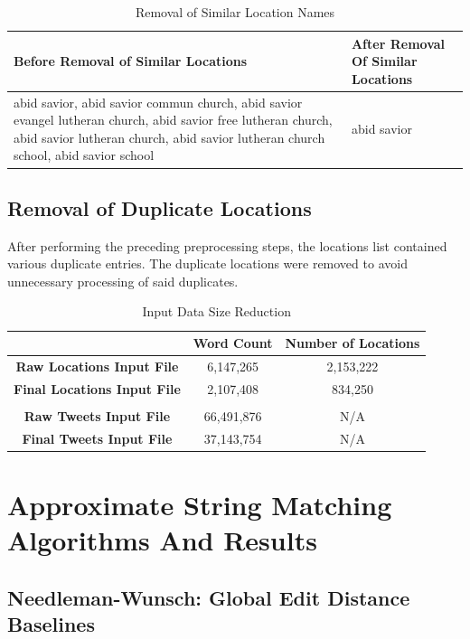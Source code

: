 \documentclass[11pt,a4paper]{article}
\begin{document}
\begin{table}[h]
\caption{Removal of Similar Location Names}	
\centering
	\begin{tabular}{| p{7cm} | p{7cm} | }
	\hline
	\textbf{Before Removal of Similar Locations} & \textbf{After Removal Of Similar Locations}\\
	\hline
	abid savior, abid savior commun church, abid savior evangel lutheran church, abid savior free lutheran church, abid savior lutheran church, abid savior lutheran church school, abid savior school & abid savior
	\\
	\hline
	\end{tabular}
\label{table:similar-locals}

\end{table}

\subsection{Removal of Duplicate Locations}       
After performing the preceding preprocessing steps, the locations list contained various duplicate entries. The duplicate locations were removed to avoid unnecessary processing of said duplicates.

\begin{table} [th]
\caption{Input Data Size Reduction}
\centering
	\begin{tabular}{| c | c | c |}
	\hline
	 &  \textbf{Word Count} & \textbf{Number of Locations}\\
	\hline
	\textbf{Raw Locations Input File} & 6,147,265 & 2,153,222\\
	\hline
	\textbf{Final Locations Input File} & 2,107,408 & 834,250\\
	\hline
	 &  & \\
	\hline
	\textbf{Raw Tweets Input File} & 66,491,876 & N/A\\
	\hline
	\textbf{Final Tweets Input File} & 37,143,754 & N/A\\
	\hline
	\end{tabular}
\label{table:input-table}
\end{table}

\section{Approximate String Matching Algorithms And Results}

\subsection{Needleman-Wunsch: Global Edit Distance Baselines}
\end{document}
